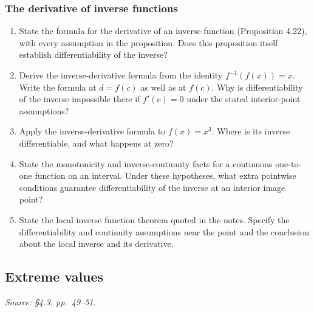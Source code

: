 \subsubsection*{The derivative of inverse functions}
\begin{enumerate}[resume]
  \item State the formula for the derivative of an inverse function
    (Proposition 4.22), with every assumption in the proposition.
    Does this proposition itself establish differentiability of the inverse?

  \item Derive the inverse-derivative formula from the identity
    \(f^{-1}(f(x))=x\). Write the formula at \(d=f(c)\) as well
    as at \(f(c)\). Why is differentiability of the inverse impossible
    there if \(f'(c)=0\) under the stated interior-point assumptions?

  \item Apply the inverse-derivative formula to \(f(x)=x^3\).
    Where is its inverse differentiable, and what happens at zero?

  \item State the monotonicity and inverse-continuity facts for a
    continuous one-to-one function on an interval.
    Under these hypotheses, what extra pointwise conditions guarantee
    differentiability of the inverse at an interior image point?

  \item State the local inverse function theorem quoted in the notes.
    Specify the differentiability and continuity assumptions near
    the point and the conclusion about the local inverse and its derivative.
\end{enumerate}

\subsection{Extreme values}
\textit{Source: \S4.3, pp.~49--51.}

